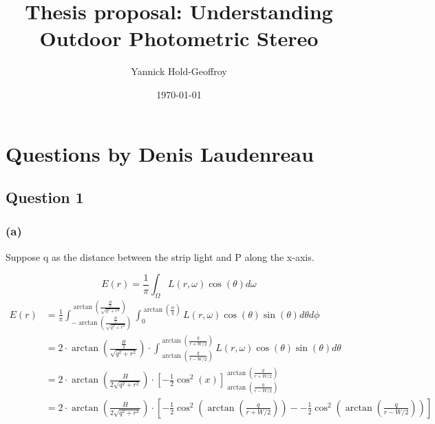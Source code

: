 \documentclass{report}
\title{Thesis proposal: Understanding Outdoor Photometric Stereo}
\author{Yannick Hold-Geoffroy}
\date{\today}
\begin{document}

\maketitle

\tableofcontents

\hypersetup{colorlinks=true,linkcolor=blue}

\newcommand*\B[1]{\mathbf{#1}}
\newcommand{\boldomega}{\boldsymbol \omega} %
\newcommand{\boldmu}{\boldsymbol \mu} %
\newcommand{\bolddelta}{\boldsymbol \delta} %

\newcommand\norm[1]{\left\lVert#1\right\rVert}

\newcommand\todo[1]{\textcolor{red}{TODO: #1}}

\graphicspath{{figures/}}

\chapter{Questions by Denis Laudenreau}

\section{Question 1}

\subsection{(a)}

Suppose q as the distance between the strip light and P along the x-axis.

\begin{equation}
E(r) = \frac{1}{\pi} \int_{\Omega} L(r,\omega)\cos(\theta) d\omega
\end{equation}
\begin{align*}
E(r) &= \frac{1}{\pi} \int_{-\arctan(\frac{\frac{H}{2}}{\sqrt{q^2+r^2}})}^{\arctan(\frac{\frac{H}{2}}{\sqrt{q^2+r^2}})} \int_{0}^{\arctan(\frac{w}{q})} L(r,\omega)\cos(\theta) \sin(\theta) d\theta d\phi \\
     &= 2 \cdot \arctan(\frac{\frac{H}{2}}{\sqrt{q^2+r^2}}) \cdot \int_{\arctan(\frac{q}{r-W/2})}^{\arctan(\frac{q}{r+W/2})} L(r,\omega)\cos(\theta) \sin(\theta) d\theta \\
     &= 2 \cdot \arctan(\frac{H}{2\sqrt{q^2+r^2}}) \cdot \left[ - \frac{1}{2} \cos^2(x) \right]_{\arctan(\frac{q}{r-W/2})}^{\arctan(\frac{q}{r+W/2})} \\
     &= 2 \cdot \arctan(\frac{H}{2\sqrt{q^2+r^2}}) \cdot \left[ - \frac{1}{2} \cos^2(\arctan(\frac{q}{r+W/2})) - - \frac{1}{2} \cos^2(\arctan(\frac{q}{r-W/2})) \right] \\
\end{align*}
\end{document}
